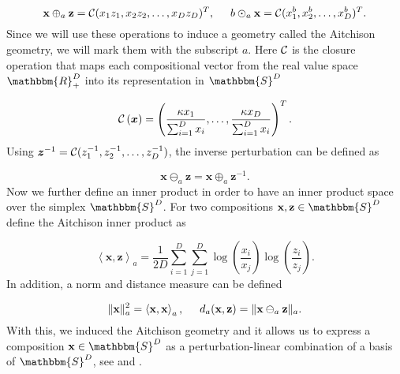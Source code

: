 \begin{equation}
\textbf{x}\oplus_a \textbf{z} = \mathcal{C}(x_1z_1,x_2z_2,\ldots,x_Dz_D)^T, \hspace{0.5cm} b \odot_a \textbf{x} = \mathcal{C}(x_1^b,x_2^b,\ldots,x_D^b)^T.
\label{eq:Simplex Operationen}
\end{equation}
%
Since we will use these operations to induce a geometry called the Aitchison geometry, we will mark them with the subscript $a$. Here $\mathcal{C}$ is the closure operation that maps each compositional vector from the real value space $\mathbbm{R}_+^D$ into its representation in $\mathbbm{S}^D$

\begin{equation}
\mathcal{C} \left(\bm{x}\right) = \left(\frac{\kappa x_1}{\sum_{i=1}^D x_i},\ldots, \frac{\kappa x_D}{\sum_{i=1}^D x_i}\right)^T.
\label{eq:Closure Operation}
\end{equation}
%
Using $\bm{z}^{-1} = \mathcal{C}(z_1^{-1},z_2^{-1},\ldots,z_D^{-1})$, the inverse perturbation can be defined as 

\begin{equation}
\textbf{x} \ominus_a \textbf{z} = \textbf{x} \oplus_a \textbf{z}^{-1}.
\label{eq: Inverse Perturbation}
\end{equation}
%
Now we further define an inner product in order to have an inner product space over the simplex $\mathbbm{S}^D$. For two compositions $\textbf{x},\textbf{z} \in \mathbbm{S}^D$ define the Aitchison inner product as 

\begin{equation}
\left\langle \textbf{x},\textbf{z} \right\rangle_a = \frac{1}{2D}\sum_{i=1}^{D}\sum_{j=1}^{D}\log(\frac{x_i}{x_j})\log(\frac{z_i}{z_j}).
\label{eq:Aitchon inner product}
\end{equation}
%
In addition, a norm and distance measure can be defined

\begin{equation}
\lVert\textbf{x}\rVert_a^2 = \left\langle  \textbf{x},\textbf{x} \right\rangle_a, \hspace{0.5cm} d_a(\textbf{x},\textbf{z}) = \lVert\textbf{x} \ominus_a \textbf{z}\rVert_a.
\label{eq:Simplex Norm and Distance}
\end{equation}
%
With this, we induced the Aitchison geometry and it allows us to express a composition $\textbf{x} \in \mathbbm{S}^D$ as a perturbation-linear combination of a basis of $\mathbbm{S}^D$, see \textcite{Filzmoser:2020} and \textcite{Kynclova:2015}.


